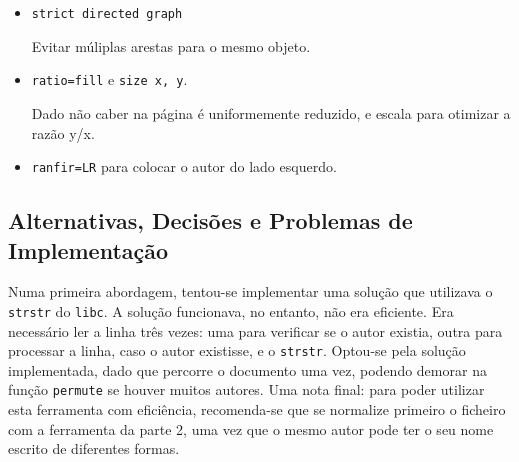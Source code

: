 \begin{itemize}
	\item \texttt{strict directed graph} 

		Evitar múliplas arestas para o mesmo objeto.

	\item \texttt{ratio=fill} e \texttt{size x, y}. 
		
		Dado não caber na página é uniformemente reduzido, e escala para otimizar
		a razão y/x.

	\item \texttt{ranfir=LR} para colocar o autor do lado esquerdo.
\end{itemize}


\subsection{Alternativas, Decisões e Problemas de Implementação}

Numa primeira abordagem, tentou-se implementar uma solução que utilizava
o \texttt{strstr} do \texttt{libc}. A solução funcionava, no entanto, não era
eficiente. Era necessário ler a linha três vezes: uma para verificar se o autor
existia, outra para processar a linha, caso o autor existisse,
e o \texttt{strstr}. Optou-se pela solução implementada, dado que percorre
o documento uma vez, podendo demorar na função \texttt{permute} se houver muitos
autores. Uma nota final: para poder utilizar esta ferramenta com eficiência,
recomenda-se que se normalize primeiro o ficheiro com a ferramenta da parte 2,
uma vez que o mesmo autor pode ter o seu nome escrito de diferentes formas.



